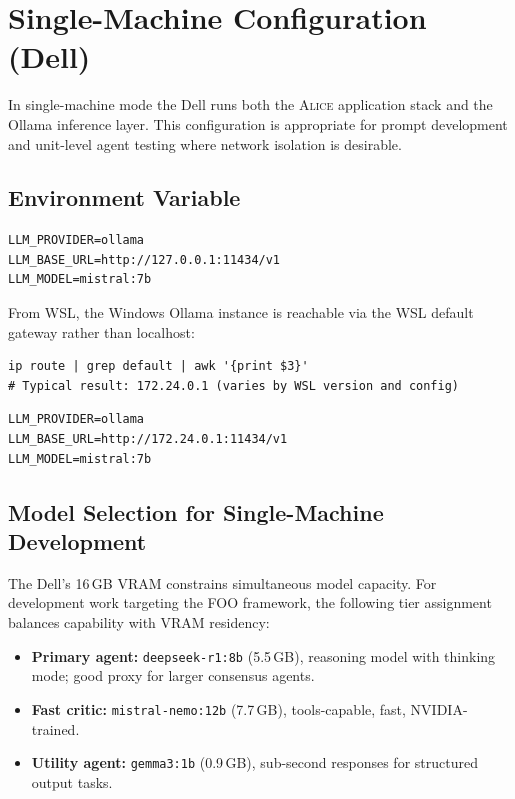 \section{Single-Machine Configuration (Dell)}
\label{sec:single}

In single-machine mode the Dell runs both the \textsc{Alice} application
stack and the Ollama inference layer. This configuration is appropriate
for prompt development and unit-level agent testing where network
isolation is desirable.

\subsection{Environment Variable}

\begin{lstlisting}[style=bashstyle, caption={.env for single-machine mode}]
LLM_PROVIDER=ollama
LLM_BASE_URL=http://127.0.0.1:11434/v1
LLM_MODEL=mistral:7b
\end{lstlisting}

From WSL, the Windows Ollama instance is reachable via the WSL default
gateway rather than localhost:

\begin{lstlisting}[style=bashstyle, caption={Find the Windows gateway IP from WSL}]
ip route | grep default | awk '{print $3}'
# Typical result: 172.24.0.1 (varies by WSL version and config)
\end{lstlisting}

\begin{lstlisting}[style=bashstyle, caption={.env for WSL accessing Windows Ollama}]
LLM_PROVIDER=ollama
LLM_BASE_URL=http://172.24.0.1:11434/v1
LLM_MODEL=mistral:7b
\end{lstlisting}

\subsection{Model Selection for Single-Machine Development}

The Dell's 16\,GB VRAM constrains simultaneous model capacity. For
development work targeting the FOO framework, the following tier
assignment balances capability with VRAM residency:

\begin{itemize}
  \item \textbf{Primary agent:} \texttt{deepseek-r1:8b} (5.5\,GB),
        reasoning model with thinking mode; good proxy for larger
        consensus agents.
  \item \textbf{Fast critic:} \texttt{mistral-nemo:12b} (7.7\,GB),
        tools-capable, fast, NVIDIA-trained.
  \item \textbf{Utility agent:} \texttt{gemma3:1b} (0.9\,GB),
        sub-second responses for structured output tasks.
\end{itemize}

